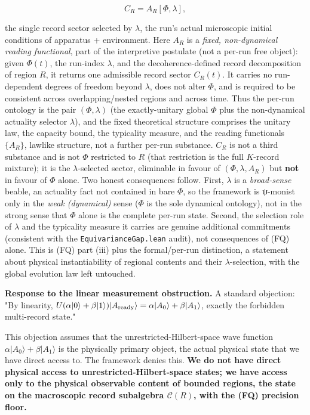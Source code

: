 \documentclass[11pt,a4paper]{article}
\begin{document}
\[
C_R = A_R[\Phi, \lambda],
\]

the single record sector selected by $\lambda$, the run's actual microscopic initial conditions of apparatus + environment. Here $A_R$ is a \emph{fixed, non-dynamical reading functional}, part of the interpretive postulate (not a per-run free object): given $\Phi(t)$, the run-index $\lambda$, and the decoherence-defined record decomposition of region $R$, it returns one admissible record sector $C_R(t)$. It carries no run-dependent degrees of freedom beyond $\lambda$, does not alter $\Phi$, and is required to be consistent across overlapping/nested regions and across time. Thus the per-run ontology is the pair $(\Phi, \lambda)$ (the exactly-unitary global $\Phi$ plus the non-dynamical actuality selector $\lambda$), and the fixed theoretical structure comprises the unitary law, the capacity bound, the typicality measure, and the reading functionals $\{A_R\}$, lawlike structure, not a further per-run substance. $C_R$ is not a third substance and is not $\Phi$ restricted to $R$ (that restriction is the full $K$-record mixture); it is the $\lambda$-selected sector, eliminable in favour of $(\Phi, \lambda, A_R)$ but \textbf{not} in favour of $\Phi$ alone. Two honest consequences follow. First, $\lambda$ is a \emph{broad-sense} beable, an actuality fact not contained in bare $\Phi$, so the framework is ψ-monist only in the \emph{weak (dynamical)} sense ($\Phi$ is the sole dynamical ontology), not in the strong sense that $\Phi$ alone is the complete per-run state. Second, the selection role of $\lambda$ and the typicality measure it carries are genuine additional commitments (consistent with the \texttt{EquivarianceGap.lean} audit), not consequences of (FQ) alone. This is (FQ) part (iii) plus the formal/per-run distinction, a statement about physical instantiability of regional contents and their $\lambda$-selection, with the global evolution law left untouched.

\textbf{Response to the linear measurement obstruction.} A standard objection: "By linearity, $U(\alpha|0\rangle + \beta|1\rangle)|A_{\rm ready}\rangle = \alpha|A_0\rangle + \beta|A_1\rangle$, exactly the forbidden multi-record state."

This objection assumes that the unrestricted-Hilbert-space wave function $\alpha|A_0\rangle + \beta|A_1\rangle$ is the physically primary object, the actual physical state that we have direct access to. The framework denies this. \textbf{We do not have direct physical access to unrestricted-Hilbert-space states; we have access only to the physical observable content of bounded regions, the state on the macroscopic record subalgebra $\mathcal{C}(R)$, with the (FQ) precision floor.}
\end{document}
